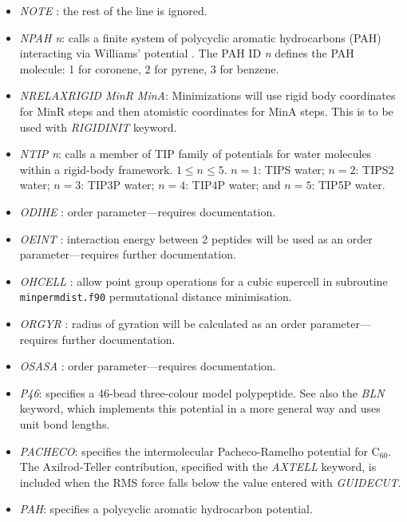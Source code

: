 \documentclass[12pt,a4paper,dvips]{article}
\begin{document}
\begin{itemize}
\item {\it NOTE \/}: the rest of the line is ignored.

\item {\it NPAH n\/}: calls a finite system of polycyclic aromatic hydrocarbons (PAH) interacting via
Williams' potential \cite{Williams80}. The PAH ID {\it n} defines the PAH molecule: 1 for coronene, 2 for
pyrene, 3 for benzene.

\item {\it NRELAXRIGID MinR MinA\/}: Minimizations will use rigid body coordinates for MinR steps and then atomistic coordinates for MinA steps. This is to be used with {\it RIGIDINIT\/} keyword.

\item {\it NTIP  n\/}: calls a member of TIP family of potentials for water molecules within a rigid-body
framework. $ 1 \le n \le 5$. $n = 1$: TIPS water; $n = 2$: TIPS2 water; $n = 3$: TIP3P water;
$n = 4$: TIP4P water; and $n = 5$: TIP5P water.

\item {\it ODIHE \/}: order parameter---requires documentation.

\item {\it OEINT \/}: interaction energy between 2 peptides will be used as an order parameter---requires 
further documentation.

\item {\it OHCELL \/}: allow point group operations for a cubic
supercell in subroutine {\tt minpermdist.f90} permutational distance minimisation.

\item {\it ORGYR \/}: radius of gyration will be calculated as an order parameter---requires 
further documentation.

\item {\it OSASA \/}: order parameter---requires documentation.

\item {\it P46\/}: specifies a 46-bead three-colour model polypeptide.
See also the {\it BLN} keyword, which implements this potential in a more
general way and uses unit bond lengths.

\item {\it PACHECO\/}: specifies the intermolecular Pacheco-Ramelho potential for C$_{60}$.
The Axilrod-Teller contribution, specified with the {\it AXTELL\/} keyword, is included
when the RMS force falls below the value entered with {\it GUIDECUT\/}.

\item{\it PAH}: specifies a polycyclic aromatic hydrocarbon potential.


\end{itemize}
\end{document}
